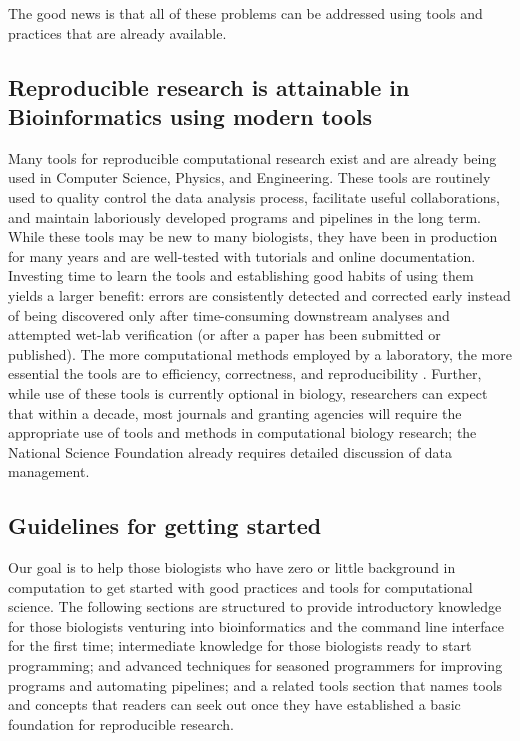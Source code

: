 \documentclass[ChapterTOCs,krantz2]{krantz} %
\begin{document}
The good news is that
all of these problems can be addressed using tools 
and practices that are already available.  

\subsection{Reproducible research is attainable in Bioinformatics using modern tools}

Many tools for reproducible computational research exist and are
already being used in Computer Science, Physics, and
Engineering.  These
tools are routinely used to quality control the data analysis process,
facilitate useful collaborations, and maintain laboriously developed programs
and pipelines in the long term.  While these tools may be new to many
biologists, they have been in production for many years and 
are well-tested with tutorials and online
documentation.  Investing time to learn the
tools and establishing good habits of using them yields a larger benefit:
errors are consistently detected and corrected early instead of being
discovered only after time-consuming downstream analyses and attempted wet-lab
verification (or after a paper has been submitted or published\cite{Miller2006}).  The more
computational methods employed by a laboratory, the more essential the tools
are to efficiency, correctness, and reproducibility \cite{bestpractices}.  Further, while 
use of these tools is currently optional in biology\cite{Ince2012}, researchers can 
expect that within a decade, most journals and granting agencies will 
require the appropriate use of tools and methods in computational biology
research; the National Science Foundation already requires detailed
discussion of data management.

\subsection{Guidelines for getting started} Our goal is to help those biologists who
have zero or little background in computation to
get started with good practices and tools for computational science. The following sections are structured to provide
introductory knowledge for those biologists venturing into bioinformatics and the
command line interface for the first time; intermediate knowledge for those
biologists ready to start programming; and advanced techniques for seasoned
programmers for improving programs and automating pipelines; and a related tools
section that names tools and concepts that readers can seek out once they
have established a basic foundation for reproducible research.
\end{document}
